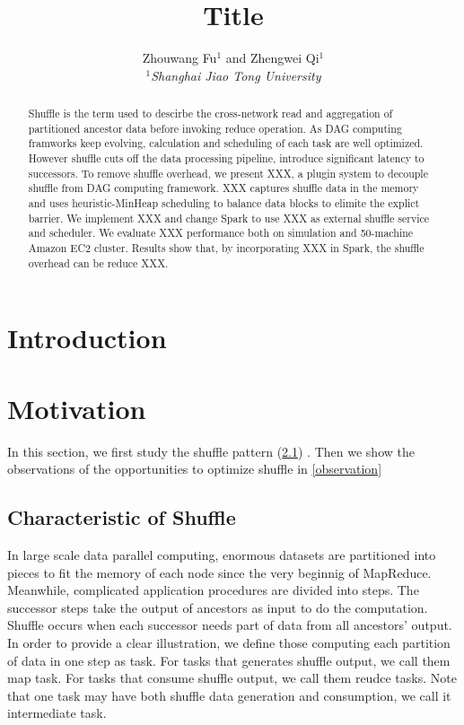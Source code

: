 \documentclass[10pt,twocolumn]{article}
\begin{document}
\title{Title}
\author{Zhouwang Fu$^1$ and Zhengwei Qi$^1$ \\
\small {\em  $^1$Shanghai Jiao Tong University} \\ [2mm]
}
\date{}
\maketitle

\begin{abstract}
Shuffle is the term used to descirbe the cross-network read and aggregation
of partitioned ancestor data before invoking reduce operation.
As DAG computing framworks keep evolving, calculation and scheduling of each task are well optimized. 
However shuffle cuts off the data processing pipeline, introduce significant latency to successors.
To remove shuffle overhead, we present XXX, a plugin system to decouple shuffle from DAG computing 
framework. XXX captures shuffle data in the memory and uses heuristic-MinHeap scheduling to balance data
blocks to elimite the explict barrier. We implement XXX and change Spark to use XXX as external shuffle 
 service and scheduler. We evaluate XXX performance both on simulation and 50-machine Amazon EC2 cluster.
 Results show that, by incorporating XXX in Spark, the shuffle overhead can be reduce XXX.

\end{abstract}

\section{Introduction}

\section{Motivation}
In this section, we first study the shuffle pattern (\ref{shuffle pattern}) . 
Then we show the observations of the opportunities to optimize shuffle in \ref{observation}
\subsection{Characteristic of Shuffle} \label{shuffle pattern}

In large scale data parallel computing, enormous datasets are partitioned into pieces to fit the memory of each node since the very beginnig of MapReduce\cite{mapreduce}.
Meanwhile, complicated application procedures are divided into steps. The successor steps take the output of ancestors as input to do the computation. Shuffle occurs when each successor needs 
part of data from all ancestors' output. In order to provide a clear illustration, we define those computing each partition of data in one step as task. For tasks that generates shuffle output, we call
them map task. For tasks that consume shuffle output, we call them reudce tasks. Note that one task may have both shuffle data generation and consumption, we call it intermediate task.
\end{document}
